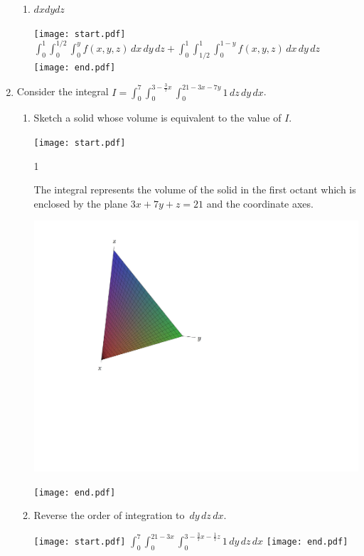 \documentclass[12pt]{article}
\begin{document}
\begin{enumerate}
\begin{enumerate}
\item $dxdydz$

\texttt{[image: start.pdf]}
{{$\int_0^1 \int_0^{1/2} \int_0^y f(x,y,z) \,dx\,dy\,dz+\int_0^1 \int_{1/2}^1 \int_0^{1-y} f(x,y,z)\,dx\,dy\,dz$}}
\texttt{[image: end.pdf]}


\end{enumerate}

\item Consider the integral $I=\int_0^7 \int_0^{3-\frac{3}{7}x} \int_0^{21-3x-7y} 1 \,dz\,dy\,dx$.

\begin{enumerate}

\item Sketch a solid whose volume is equivalent to the value of $I$.

\texttt{[image: start.pdf]}
{{{1\linewidth}{The integral represents the volume of the solid in the first octant which is enclosed by the plane $3x+7y+z=21$ and the coordinate axes.
\begin{center}
\includegraphics[scale=0.4]{volume2.pdf}
\end{center}
}}}
\texttt{[image: end.pdf]}


\item Reverse the order of integration to $\,dy\,dz\,dx$.

\texttt{[image: start.pdf]}
{{$\int_0^7 \int_0^{21-3x} \int_0^{3-\frac{3}{7}x-\frac{1}{7}z} 1\,dy\,dz\,dx$}}
\texttt{[image: end.pdf]}


\end{enumerate}


\end{enumerate}
\end{document}
